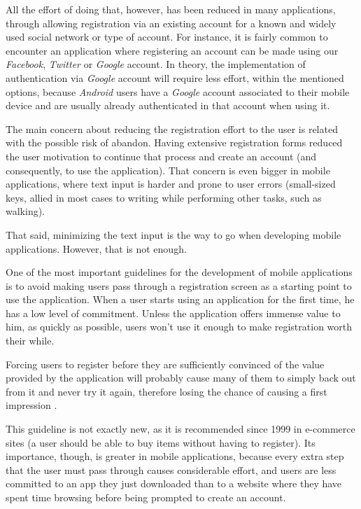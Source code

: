 All the effort of doing that, however, has been reduced in many applications, through allowing registration via an existing account for a known and widely used social network or type of account. For instance, it is fairly common to encounter an application where registering an account can be made using our \emph{Facebook}, \emph{Twitter} or \emph{Google} account. In theory, the implementation of authentication via \emph{Google} account will require less effort, within the mentioned options, because \emph{Android} users have a \emph{Google} account associated to their mobile device and are usually already authenticated in that account when using it.

The main concern about reducing the registration effort to the user is related with the possible risk of abandon. Having extensive registration forms reduced the user motivation to continue that process and create an account (and consequently, to use the application). That concern is even bigger in mobile applications, where text input is harder and prone to user errors (small-sized keys, allied in most cases to writing while performing other tasks, such as walking).

That said, minimizing the text input is the way to go when developing mobile applications. However, that is not enough.

One of the most important guidelines for the development of mobile applications is to avoid making users pass through a registration screen as a starting point to use the application. 
When a user starts using an application for the first time, he has a low level of commitment. Unless the application offers immense value to him, as quickly as possible, users won't use it enough to make registration worth their while. 

Forcing users to register before they are sufficiently convinced of the value provided by the application will probably cause many of them to simply back out from it and never try it again, therefore losing the chance of causing a first impression \cite{kn:NB12}.

This guideline is not exactly new, as it is recommended since 1999 in e-commerce sites (a user should be able to buy items without having to register). Its importance, though, is greater in mobile applications, because every extra step that the user must pass through causes considerable effort, and users are less committed to an app they just downloaded than to a website where they have spent time browsing before being prompted to create an account.

